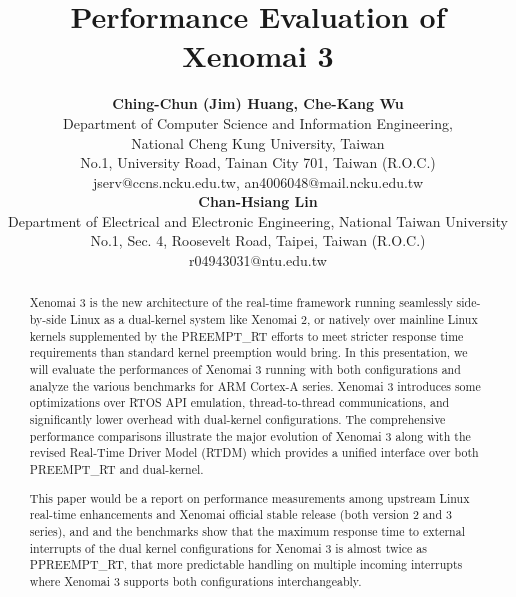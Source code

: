 \documentclass[10pt,a4paper]{article}
\title{\LARGE
Performance Evaluation of Xenomai 3
}
\author{\large
{\bf Ching-Chun (Jim) Huang, Che-Kang Wu }\\
Department of Computer Science and Information Engineering, \\
National Cheng Kung University, Taiwan\\
No.1, University Road, Tainan City 701, Taiwan (R.O.C.)\\
\vspace{8mm}
jserv$@$ccns.ncku.edu.tw, an4006048$@$mail.ncku.edu.tw\\
{\bf Chan-Hsiang Lin}\\
Department of Electrical and Electronic Engineering, National Taiwan University\\
No.1, Sec. 4, Roosevelt Road, Taipei, Taiwan (R.O.C.)\\
\vspace{8mm}
r04943031$@$ntu.edu.tw\\
}
\date{}
\begin{document}
\maketitle

\begin{abstract}
Xenomai 3 is the new architecture of the real-time framework running seamlessly side-by-side Linux as a dual-kernel system like Xenomai 2, or natively over mainline Linux kernels supplemented by the PREEMPT\_RT efforts to meet stricter response time requirements than standard kernel preemption would bring. In this presentation, we will evaluate the performances of Xenomai 3 running with both configurations and analyze the various benchmarks for ARM Cortex-A series. Xenomai 3 introduces some optimizations over RTOS API emulation, thread-to-thread communications, and significantly lower overhead with dual-kernel configurations. The comprehensive performance comparisons illustrate the major evolution of Xenomai 3 along with the revised Real-Time Driver Model (RTDM) which provides a unified interface over both PREEMPT\_RT and dual-kernel.

This paper would be a report on performance measurements among upstream Linux real-time enhancements and Xenomai official stable release (both version 2 and 3 series), and and the benchmarks show that the maximum response time to external interrupts of the dual kernel configurations for Xenomai 3 is almost twice as PPREEMPT\_RT, that more predictable handling on multiple incoming interrupts where Xenomai 3 supports both configurations interchangeably.
\end{abstract}

\vspace{10mm}
\end{document}

